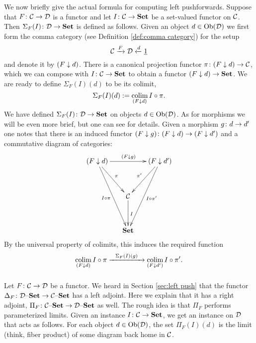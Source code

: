 \documentclass[CT4S-EN-RU]{subfiles}
\begin{document}
\begin{exerciseRUS}
\end{exerciseRUS}

\begin{blockENG}
We now briefly give the actual formula for computing left pushforwards. Suppose that $F\colon\mathcal{C}\rightarrow\mathcal{D}$ is a functor and let $I\colon\mathcal{C}\rightarrow{\bf Set}$ be a set-valued functor on $\mathcal{C}$. Then $\Sigma_F(I)\colon\mathcal{D}\rightarrow{\bf Set}$ is defined as follows. Given an object $d\in\textnormal{Ob}(\mathcal{D})$ we first form the comma category (see Definition \ref{def:comma category}) for the setup
$$\mathcal{C}\xrightarrow{F}\mathcal{D}\xleftarrow{d}\underline{1}$$
and denote it by $(F\downarrow d)$. There is a canonical projection functor $\pi\colon(F\downarrow d)\rightarrow\mathcal{C}$, which we can compose with $I\colon\mathcal{C}\rightarrow{\bf Set}$ to obtain a functor $(F\downarrow d)\rightarrow{\bf Set}$. We are ready to define $\Sigma_F(I)(d)$ to be its colimit,
$$\Sigma_F(I)(d):=\mathop{\textnormal{colim}}_{(F\downarrow d)}I\circ\pi.$$
We have defined $\Sigma_F(I)\colon\mathcal{D}\rightarrow{\bf Set}$ on objects $d\in\textnormal{Ob}(\mathcal{D})$. As for morphisms we will be even more brief, but one can see \cite{Sp1} for details. Given a morphism $g\colon d\rightarrow d'$ one notes that there is an induced functor $(F\downarrow g)\colon (F\downarrow d)\rightarrow(F\downarrow d')$ and a commutative diagram of categories:
$$
\xymatrix@=15pt{
(F\down d)\ar[rr]^{(F\down g)}\ar[ddr]^{\pi}\ar[ddddr]_{I\circ\pi}&&(F\down d')\ar[ddl]_{\pi'}\ar[ddddl]^{I\circ\pi'}\\\\
&\mcC\ar[dd]^I\\\\
&\Set
}
$$
By the universal property of colimits, this induces the required function $$\mathop{\textnormal{colim}}_{(F\downarrow d)}I\circ\pi\xrightarrow{\ \ \Sigma_F(I)(g)\ \ }\mathop{\textnormal{colim}}_{(F\downarrow d')}I\circ\pi'.$$
\end{blockENG}

\begin{blockRUS}
\end{blockRUS}


\subsubsection{}

\begin{blockENG}
Let $F\colon\mathcal{C}\rightarrow\mathcal{D}$ be a functor. We heard in Section \ref{sec:left push} that the functor $\Delta_F\colon\mathcal{D}{\text \textendash}{\bf Set}\rightarrow\mathcal{C}{\text \textendash}{\bf Set}$ has a left adjoint. Here we explain that it has a right adjoint, $\Pi_F\colon\mathcal{C}{\text \textendash}{\bf Set}\rightarrow\mathcal{D}{\text \textendash}{\bf Set}$ as well. The rough idea is that $\Pi_F$ performs parameterized limits. Given an instance $I\colon\mathcal{C}\rightarrow{\bf Set}$, we get an instance on $\mathcal{D}$ that acts as follows. For each object $d\in\textnormal{Ob}(\mathcal{D})$, the set $\Pi_F(I)(d)$ is the limit (think, fiber product) of some diagram back home in $\mathcal{C}$. 
\end{blockENG}
\end{document}
